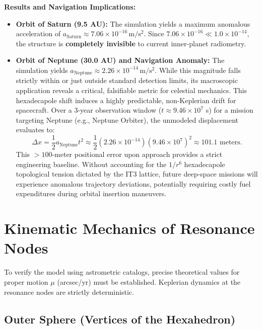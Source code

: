 \documentclass[11pt,a4paper]{article}
\theoremstyle{remark}
\begin{document}
\textbf{Results and Navigation Implications:}
\begin{itemize}[leftmargin=2em]
    \item \textbf{Orbit of Saturn (9.5 AU):} The simulation yields a maximum anomalous acceleration of $a_{\text{Saturn}} \approx 7.06 \times 10^{-16}\,\mathrm{m/s^2}$. Since $7.06 \times 10^{-16} \ll 1.0 \times 10^{-14}$, the structure is \textbf{completely invisible} to current inner-planet radiometry.
    
    \item \textbf{Orbit of Neptune (30.0 AU) and Navigation Anomaly:} The simulation yields $a_{\text{Neptune}} \approx 2.26 \times 10^{-14}\,\mathrm{m/s^2}$. While this magnitude falls strictly within or just outside standard detection limits, its macroscopic application reveals a critical, falsifiable metric for celestial mechanics. This hexadecapole shift induces a highly predictable, non-Keplerian drift for spacecraft. Over a 3-year observation window ($t \approx 9.46 \times 10^7$ s) for a mission targeting Neptune (e.g., Neptune Orbiter), the unmodeled displacement evaluates to:
    \begin{equation}
        \Delta x = \frac{1}{2} a_{\text{Neptune}} t^2 \approx \frac{1}{2} (2.26 \times 10^{-14}) (9.46 \times 10^7)^2 \approx 101.1 \text{ meters}.
    \end{equation}
    This $>100$-meter positional error upon approach provides a strict engineering baseline. Without accounting for the $1/r^6$ hexadecapole topological tension dictated by the IT3 lattice, future deep-space missions will experience anomalous trajectory deviations, potentially requiring costly fuel expenditures during orbital insertion maneuvers.
\end{itemize}

\section{Kinematic Mechanics of Resonance Nodes}

To verify the model using astrometric catalogs, precise theoretical values for proper motion $\mu$ (arcsec/yr) must be established. Keplerian dynamics at the resonance nodes are strictly deterministic.

\subsection{Outer Sphere (Vertices of the Hexahedron)}
\end{document}
